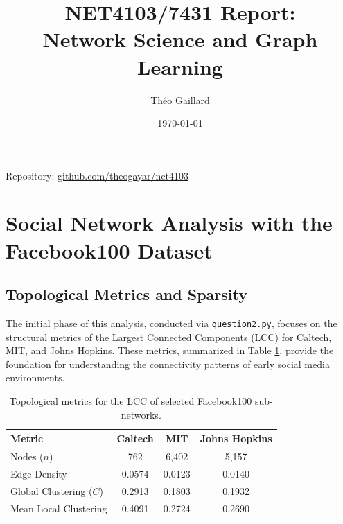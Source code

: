 \documentclass[12pt]{article}
\title{NET4103/7431 Report: \\ Network Science and Graph Learning}
\author{Théo Gaillard}
\date{\today}
\begin{document}
\maketitle

\begin{center}
    Repository: \href{https://github.com/theogayar/net4103}{github.com/theogayar/net4103}
\end{center}

\tableofcontents
\newpage


\section{Social Network Analysis with the Facebook100 Dataset}
\label{sec:network_analysis}

\subsection{Topological Metrics and Sparsity}

The initial phase of this analysis, conducted via \texttt{question2.py}, focuses on the structural metrics of the Largest Connected Components (LCC) for Caltech, MIT, and Johns Hopkins. These metrics, summarized in Table \ref{tab:network_metrics}, provide the foundation for understanding the connectivity patterns of early social media environments.

\begin{table}[ht!]
    \centering
    \begin{tabular}{lccc}
        \toprule
        \textbf{Metric}         & \textbf{Caltech} & \textbf{MIT} & \textbf{Johns Hopkins} \\
        \midrule
        Nodes ($n$)             & 762              & 6,402        & 5,157                  \\
        Edge Density            & 0.0574           & 0.0123       & 0.0140                 \\
        Global Clustering ($C$) & 0.2913           & 0.1803       & 0.1932                 \\
        Mean Local Clustering   & 0.4091           & 0.2724       & 0.2690                 \\
        \bottomrule
    \end{tabular}
    \caption{Topological metrics for the LCC of selected Facebook100 sub-networks.}
    \label{tab:network_metrics}
\end{table}
\end{document}
